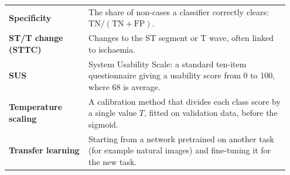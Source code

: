 \documentclass[12pt,nonacm,acmlarge,titlepage,screen]{acmart}
\begin{document}
\begin{longtable}{@{}>{\raggedright\arraybackslash}P{0.27\linewidth} P{0.68\linewidth}@{}}
  \textbf{Specificity} & The share of non-cases a classifier correctly clears: $\mathrm{TN}/(\mathrm{TN}+\mathrm{FP})$. \\
  \textbf{ST/T change (STTC)} & Changes to the ST segment or T wave, often linked to ischaemia. \\
  \textbf{SUS} & System Usability Scale: a standard ten-item questionnaire giving a usability score from 0 to 100, where 68 is average. \\
  \textbf{Temperature scaling} & A calibration method that divides each class score by a single value $T$, fitted on validation data, before the sigmoid. \\
  \textbf{Transfer learning} & Starting from a network pretrained on another task (for example natural images) and fine-tuning it for the new task. \\
\end{longtable}
\endgroup
  
\end{document}
